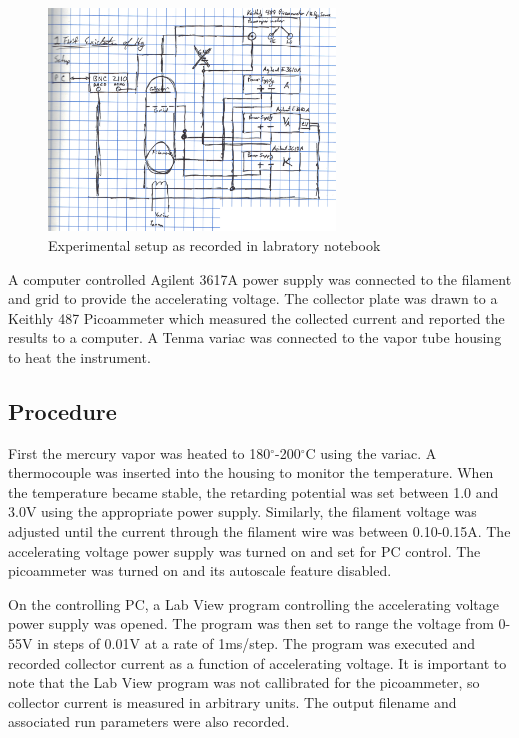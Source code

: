 \documentclass[12pt,twocolumn]{article}
\begin{document}
\begin{figure}[h!] 
	\centering
	\includegraphics[width=3in]{images/HgSetup}
	\caption{Experimental setup as recorded in labratory notebook}
	\label{fig:HgSetup}
\end{figure}

A computer controlled Agilent 3617A power supply was connected to the filament and grid to provide the accelerating voltage. The collector plate was drawn to a Keithly 487 Picoammeter which measured the collected current and reported the results to a computer. A Tenma variac was connected to the vapor tube housing to heat the instrument.

\subsection{Procedure}

First the mercury vapor was heated to 180$^{\circ}$-200$^{\circ}$C using the variac. A thermocouple was inserted into the housing to monitor the temperature. When the temperature became stable, the retarding potential was set between 1.0 and 3.0V using the appropriate power supply. Similarly, the filament voltage was adjusted until the current through the filament wire was between 0.10-0.15A. The accelerating voltage power supply was turned on and set for PC control. The picoammeter was turned on and its autoscale feature disabled.

On the controlling PC, a Lab View program controlling the accelerating voltage power supply was opened. The program was then set to range the voltage from 0-55V in steps of 0.01V at a rate of 1ms/step. The program was executed and recorded collector current as a function of accelerating voltage. It is important to note that the Lab View program was not callibrated for the picoammeter, so collector current is measured in arbitrary units. The output filename and associated run parameters were also recorded.
\end{document}
